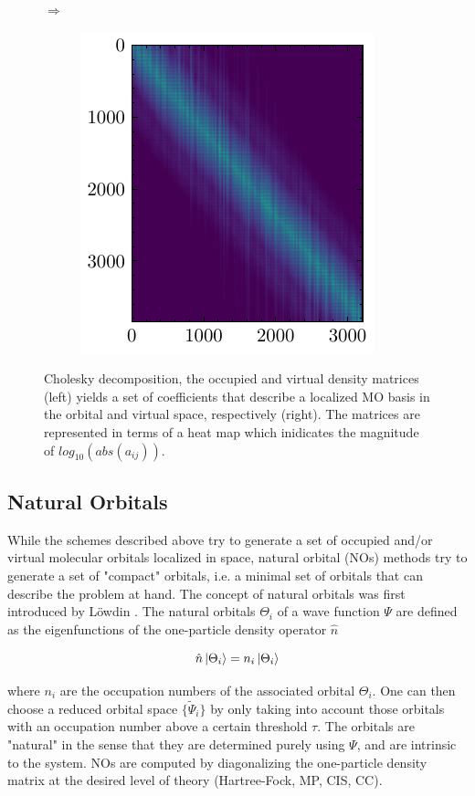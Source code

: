 \begin{figure}[h]
\begin{subfigure}{0.5\linewidth}
\end{subfigure}
$\Longrightarrow$
\begin{subfigure}{0.4\linewidth}
\centering
\includegraphics[scale=1.0]{choleskyV}
\end{subfigure}%
\caption{Cholesky decomposition, the occupied and virtual density matrices (left) yields a set of coefficients that describe a localized MO basis in the orbital and virtual space, respectively (right). The matrices are represented in terms of a heat map which inidicates the magnitude of $log_{10}(abs(a_{ij}))$.}
\label{fig:LOCORB_CHOL}
\end{figure} 

\subsection{Natural Orbitals}

While the schemes described above try to generate a set of occupied and/or virtual molecular orbitals localized in space, natural orbital (NOs) methods try to generate a set of "compact" orbitals, i.e. a minimal set of orbitals that can describe the problem at hand. The concept of natural orbitals was first introduced by Löwdin \cite{Low1956}. The natural orbitals $\Theta_i$ of a wave function $\Psi$ are defined as the eigenfunctions of the one-particle density operator $\hat{n}$

\begin{equation}
\hat{n}\ket{\Theta_i} = n_i \ket{\Theta_i} 
\end{equation}

\noindent where $n_i$ are the occupation numbers of the associated orbital $\Theta_i$. One can then choose a reduced orbital space $\{\tilde{\Psi}_i\}$ by only taking into account those orbitals with an occupation number above a certain threshold $\tau$. The orbitals are "natural" in the sense that they are determined purely using $\Psi$, and are intrinsic to the system. NOs are computed by diagonalizing the one-particle density matrix at the desired level of theory (Hartree-Fock, MP, CIS, CC). 

